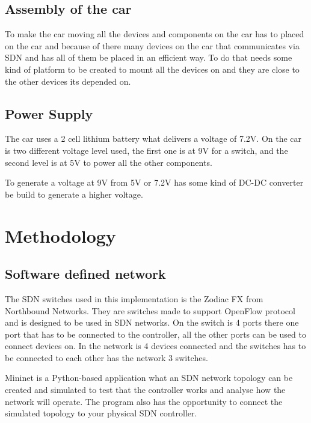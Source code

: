 \documentclass[11pt, titlepage]{article} %
\begin{document}
\subsection{Assembly of the car}
To make the car moving all the devices and components on the car has to placed on the car and because of there many devices on the car that communicates via SDN and has all of them be placed in an efficient way. To do that needs some kind of platform to be created to mount all the devices on and they are close to the other devices its depended on. 


\subsection{Power Supply}
The car uses a 2 cell lithium battery what delivers a voltage of 7.2V. On the car is two different voltage level used, the first one is at 9V for a switch, and the second level is at 5V to power all the other components. 

To generate a voltage at 9V from 5V or 7.2V has some kind of DC-DC converter be build to generate a higher voltage. 


\clearpage
\section{Methodology}
\subsection{Software defined network}

The SDN switches used in this implementation is the Zodiac FX from Northbound Networks. They are switches made to support OpenFlow protocol and is designed to be used in SDN networks. On the switch is 4 ports there one port that has to be connected to the controller, all the other ports can be used to connect devices on. In the network is 4 devices connected and the switches has to be connected to each other has the network 3 switches. 

Mininet is a Python-based application what an SDN network topology can be created and simulated to test that the controller works and analyse how the network will operate. The program also has the opportunity to connect the simulated topology to your physical SDN controller. 
\end{document}
